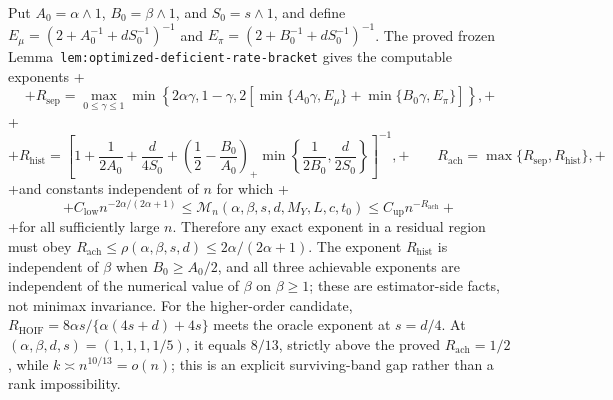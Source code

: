 Put \(A_0=\alpha\wedge1\), \(B_0=\beta\wedge1\), and \(S_0=s\wedge1\), and define \(E_\mu=(2+A_0^{-1}+dS_0^{-1})^{-1}\) and \(E_\pi=(2+B_0^{-1}+dS_0^{-1})^{-1}\). The proved frozen Lemma~\texttt{lem:optimized-deficient-rate-bracket} gives the computable exponents
+\[
+R_{\mathrm{sep}}=\max_{0\le\gamma\le1}\min\left\{2\alpha\gamma,1-\gamma,2\left[\min\{A_0\gamma,E_\mu\}+\min\{B_0\gamma,E_\pi\}\right]\right\},
+\]
+\[
+R_{\mathrm{hist}}=\left[1+\frac1{2A_0}+\frac d{4S_0}+\left(\frac12-\frac{B_0}{A_0}\right)_+\min\left\{\frac1{2B_0},\frac d{2S_0}\right\}\right]^{-1},
+\qquad R_{\mathrm{ach}}=\max\{R_{\mathrm{sep}},R_{\mathrm{hist}}\},
+\]
+and constants independent of \(n\) for which
+\[
+C_{\mathrm{low}}n^{-2\alpha/(2\alpha+1)}\le \mathcal M_n(\alpha,\beta,s,d,M_Y,L,c,t_0)\le C_{\mathrm{up}}n^{-R_{\mathrm{ach}}}
+\]
+for all sufficiently large \(n\). Therefore any exact exponent in a residual region must obey \(R_{\mathrm{ach}}\le\rho(\alpha,\beta,s,d)\le2\alpha/(2\alpha+1)\). The exponent \(R_{\mathrm{hist}}\) is independent of \(\beta\) when \(B_0\ge A_0/2\), and all three achievable exponents are independent of the numerical value of \(\beta\) on \(\beta\ge1\); these are estimator-side facts, not minimax invariance. For the higher-order candidate, \(R_{\mathrm{HOIF}}=8\alpha s/\{\alpha(4s+d)+4s\}\) meets the oracle exponent at \(s=d/4\). At \((\alpha,\beta,d,s)=(1,1,1,1/5)\), it equals \(8/13\), strictly above the proved \(R_{\mathrm{ach}}=1/2\), while \(k\asymp n^{10/13}=o(n)\); this is an explicit surviving-band gap rather than a rank impossibility.